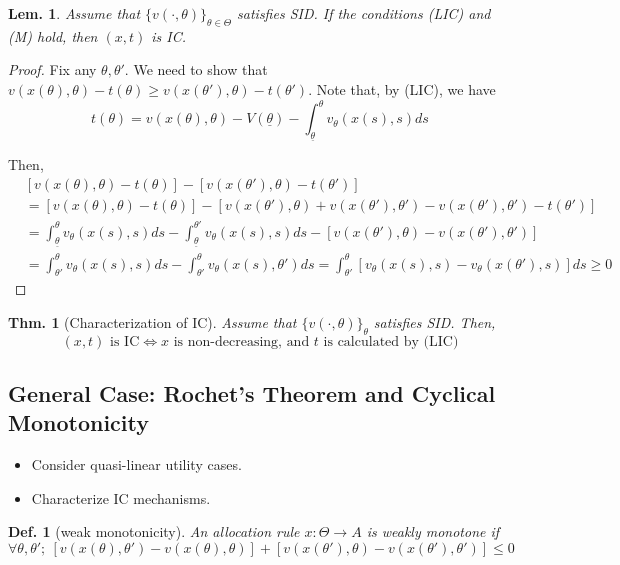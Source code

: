 \documentclass[11pt,a4paper,dvipdfmx]{article}
\theoremstyle{plain}
\newtheorem{thm}{Thm.}[section]
\newtheorem{lem}{Lem.}[section]
\newtheorem{df}{Def.}[section]
\newcommand{\equi}{\Longleftrightarrow}
\newcommand{\1}{\mathbbm{1}}
\begin{document}
\begin{lem}
	Assume that $\{v(\cdot, \theta)\}_{\theta \in \Theta}$ satisfies SID. If the conditions (LIC) and (M) hold, then $(x,t)$ is IC.
\end{lem}
\begin{proof}
	Fix any $\theta, \theta'$. We need to show that $v(x(\theta), \theta) - t(\theta) \geq v(x(\theta'), \theta) - t(\theta')$.
	Note that, by (LIC), we have 
	\[
	t(\theta) = v(x(\theta), \theta) - V(\underline{\theta}) - \int_{\underline{\theta}}^\theta
	 v_\theta(x(s), s) ds
	\]
	
	Then,
	\begin{align*}
		&[v(x(\theta), \theta) - t(\theta)] - [v(x(\theta'), \theta) - t(\theta')] \\
		&=
		[v(x(\theta), \theta) - t(\theta)] - [v(x(\theta'), \theta) + v(x(\theta'), \theta') - v(x(\theta'), \theta') - t(\theta')] \\
		&=
		\int_{\underline{\theta}}^\theta v_\theta(x(s), s) ds
		- \int_{\underline{\theta}}^{\theta'} v_\theta(x(s), s) ds
		- [v(x(\theta'), \theta) - v(x(\theta'), \theta')] \\
		&= \int_{\theta'}^\theta v_\theta(x(s), s) ds
		- \int_{\theta'}^\theta v_\theta(x(s), \theta') ds
		= \int_{\theta'}^\theta [v_\theta(x(s), s) - v_\theta(x(\theta'), s)] ds \geq 0
	\end{align*}
\end{proof}

\begin{thm}[Characterization of IC]
	Assume that $\{v(\cdot, \theta)\}_\theta$ satisfies SID. Then, 
	\[
	\text{$(x, t)$ is IC} \equi \text{$x$ is non-decreasing, and $t$ is calculated by (LIC)}
	\]
\end{thm}


\subsection{General Case: Rochet's Theorem and Cyclical Monotonicity}
\begin{itemize}
	\item Consider quasi-linear utility cases.
	\item Characterize IC mechanisms.
\end{itemize}

\begin{df}[weak monotonicity]
	An allocation rule $x: \Theta \to A$ is weakly monotone if
	\[
	\forall \theta, \theta' ; \ [v(x(\theta), \theta') - v(x(\theta), \theta)]  + [v(x(\theta'), \theta) - v(x(\theta'), \theta')] \leq 0
	\]
\end{df}
\end{document}
